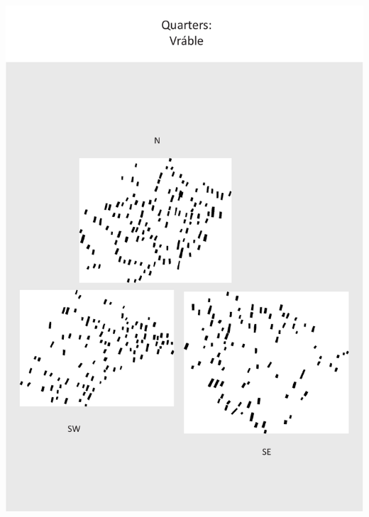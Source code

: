 \documentclass[
  12pt,
  a4paper, twoside]{book}
\begin{document}
\begin{center}\includegraphics[width=1\linewidth]{Appendix/quart_vra} \end{center}

\newpage
\end{document}
